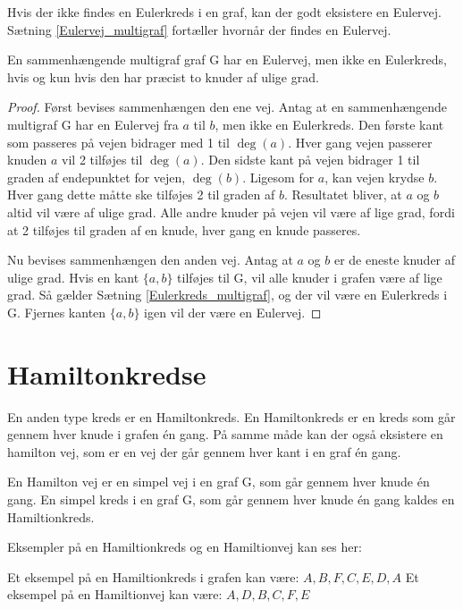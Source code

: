 Hvis der ikke findes en Eulerkreds i en graf, kan der godt eksistere en Eulervej. 
Sætning \ref{Eulervej_multigraf} fortæller hvornår der findes en Eulervej. 

\begin{thm} \label{Eulervej_multigraf}
	En sammenhængende multigraf graf G har en Eulervej, men ikke en Eulerkreds, hvis og kun hvis den har præcist to knuder af ulige grad.  
\end{thm} 

\begin{proof}
	Først bevises sammenhængen den ene vej. 
	Antag at en sammenhængende multigraf G har en Eulervej fra $a$ til $b$, men ikke en Eulerkreds. 
	Den første kant som passeres på vejen bidrager med 1 til $\deg(a)$. 
	Hver gang vejen passerer knuden $a$ vil 2 tilføjes til $\deg(a)$. 
	Den sidste kant på vejen bidrager 1 til graden af endepunktet for vejen, $\deg(b)$. 
	Ligesom for $a$, kan vejen krydse $b$. 
	Hver gang dette måtte ske tilføjes 2 til graden af $b$. 
	Resultatet bliver, at $a$ og $b$ altid vil være af ulige grad. 
	Alle andre knuder på vejen vil være af lige grad, fordi at 2 tilføjes til graden af en knude, hver gang en knude passeres.  
	
	Nu bevises sammenhængen den anden vej.
	Antag at $a$ og $b$ er de eneste knuder af ulige grad. 
	Hvis en kant $\lbrace a,b \rbrace$ tilføjes til G, vil alle knuder i grafen være af lige grad. 
	Så gælder Sætning \ref{Eulerkreds_multigraf}, og der vil være en Eulerkreds i G. 
	Fjernes kanten $\lbrace a,b \rbrace$ igen vil der være en Eulervej. 
\end{proof}

\section{Hamiltonkredse}
En anden type kreds er en Hamiltonkreds. 
En Hamiltonkreds er en kreds som går gennem hver knude i grafen én gang. På samme måde kan der også eksistere en hamilton vej, som er en vej der går gennem hver kant i en graf én gang. 

\begin{defn} \label{hamiltion_defn}
	En Hamilton vej er en simpel vej i en graf G, som går gennem hver knude én gang.
	En simpel kreds i en graf G, som går gennem hver knude én gang kaldes en Hamiltionkreds.
\end{defn}

\begin{exmp}
	Eksempler på en Hamiltionkreds og en Hamiltionvej kan ses her:
	
	
	
	Et eksempel på en Hamiltionkreds i grafen kan være: $A,B,F,C,E,D,A$
	Et eksempel på en Hamiltionvej kan være: $A,D,B,C,F,E$
\end{exmp}

